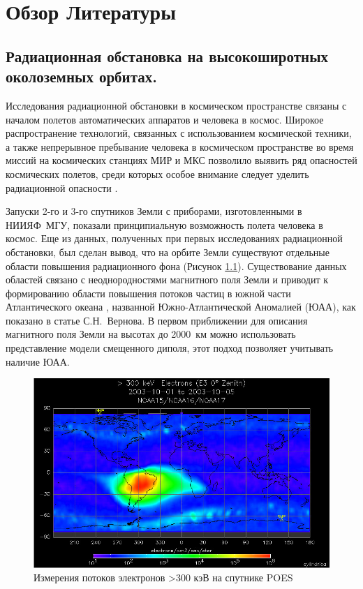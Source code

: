 \chapter{Обзор Литературы} \label{chapt1}

\section{Радиационная обстановка на высокоширотных околоземных орбитах. } \label{sect1_1}

Исследования радиационной обстановки в космическом пространстве связаны с началом полетов автоматических аппаратов и человека в космос.  Широкое распространение технологий, связанных с использованием космической техники, а также непрерывное пребывание человека в космическом пространстве во время миссий на космических станциях МИР и МКС позволило выявить ряд опасностей космических полетов, среди которых особое внимание следует уделить радиационной опасности \cite{logachev2007}.


Запуски 2-го и 3-го спутников Земли с приборами, изготовленными в НИИЯФ~МГУ,  
показали принципиальную возможность полета человека в космос.  Еще из данных, полученных при первых исследованиях радиационной 
обстановки, был сделан вывод, что на орбите Земли существуют отдельные области повышения радиационного фона (Рисунок \ref{fig:cylindricalpoes200310mep}). Существование данных областей связано с неоднородностями 
магнитного поля Земли и приводит к формированию области повышения потоков 
частиц в  
южной части Атлантического океана \cite{logachev2007}, названной Южно-Атлантической 
Аномалией (ЮАА), как показано в статье  С.Н.~Вернова\cite{vernov1961}. В первом 
приближении для описания магнитного поля Земли на высотах до 2000~км можно 
использовать представление модели смещенного диполя, этот подход позволяет 
учитывать наличие ЮАА.

\begin{figure}
	\centering
	\includegraphics[width=0.7\linewidth]{images/cylindrical_poes_200310_mep}
	\caption{Измерения потоков электронов >300 кэВ на спутнике POES \cite{Peck2008}}
	\label{fig:cylindricalpoes200310mep}
\end{figure}

